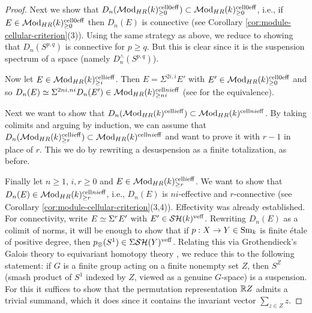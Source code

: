 \documentclass{amsart}
\numberwithin{proposition}{section}
\numberwithin{equation}{section}
\def\cell{\mathrm{cell}}
\begin{document}
\begin{proof}
Next we show that $D_n(\Mod_{HR}(k)^{\cell 0 \eff}_{\ge 0}) \subset \Mod_{HR}(k)^{\cell 0 \eff}_{\ge 0}$, i.e., if $E \in \Mod_{HR}(k)^{\cell 0 \eff}_{\ge 0}$ then $D_n(E)$ is connective (see Corollary \ref{cor:module-cellular-criterion}(3)).
Using the same strategy as above, we reduce to showing that $D_n(S^{p,q})$ is connective for $p \ge q$.
But this is clear since it is the suspension spectrum of a space (namely $D_n^\wedge(S^{p,q})$).

Now let $E \in \Mod_{HR}(k)^{\cell i \eff}_{\ge i}$.
Then $E = \Sigma^{2i,i}E'$ with $E' \in \Mod_{HR}(k)^{\cell 0 \eff}_{\ge 0}$ and so $D_n(E) \wequi \Sigma^{2ni,ni} D_n(E') \in \Mod_{HR}(k)^{\cell ni \eff}_{\ge ni}$ (see \cite[Proposition~5.37]{bachmann-colimits} for the equivalence).

Next we want to show that $D_n(\Mod_{HR}(k)^{\cell i \eff}) \subset \Mod_{HR}(k)^{\cell ni \eff}$.
By taking colimits and arguing by induction, we can assume that $D_n(\Mod_{HR}(k)^{\cell i \eff}_{\ge r}) \subset \Mod_{HR}(k)^{\cell ni \eff}$ and want to prove it with $r-1$ in place of $r$.
This we do by rewriting a desuspension as a finite totalization, as before.

Finally let $n \ge 1$, $i, r \ge 0$ and $E \in \Mod_{HR}(k)^{\cell i \eff}_{\ge r}$.
We want to show that $D_n(E) \in \Mod_{HR}(k)^{\cell ni \eff}_{\ge r}$, i.e., $D_n(E)$ is $ni$-effective and $r$-connective (see Corollary \ref{cor:module-cellular-criterion}(3,4)).
Effectivity was already established.
For connectivity, write $E \simeq \Sigma^r E'$ with $E' \in \mathcal{SH}(k)^{\text{veff}}$.
Rewriting $D_n(E)$ as a colimit of norms, it will be enough to show that if $p: X \to Y \in {\mathrm{S}\mathrm{m}}_k$ is finite étale of positive degree, then $p_\otimes(S^1) \in \Sigma \mathcal{SH}(Y)^{\text{veff}}$.
Relating this via Grothendieck's Galois theory to equivariant homotopy theory \cite[\S10.2]{bachmann-norms}, we reduce this to the following statement: if $G$ is a finite group acting on a finite nonempty set $Z$, then $S^Z$ (smash product of $S^1$ indexed by $Z$, viewed as a genuine $G$-space) is a suspension.
For this it suffices to show that the permutation representation $\mathbb R{Z}$ admits a trivial summand, which it does since it contains the invariant vector $\sum_{z \in Z} z$.


\end{proof}
\end{document}
